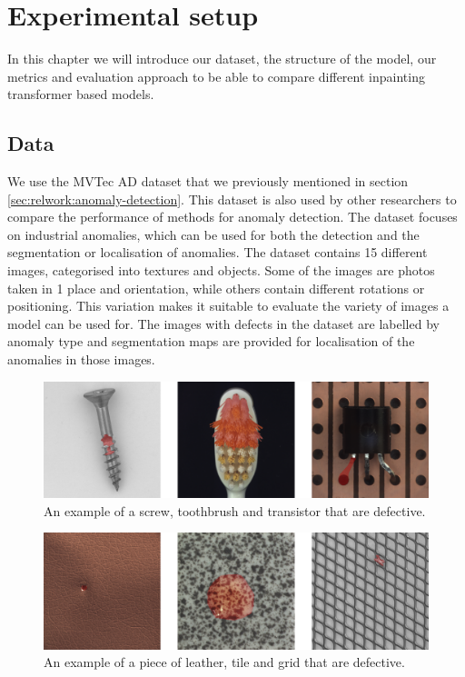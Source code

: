 \chapter{Experimental setup}\label{ch:experimental-setup}

In this chapter we will introduce our dataset, the structure of the model, our metrics and evaluation approach to be able to compare different inpainting transformer based models.

\section{Data}
\label{sec:experimental-setup:data}

We use the MVTec AD dataset that we previously mentioned in section \ref{sec:relwork:anomaly-detection}. This dataset is also used by other researchers \cite{pirnay_inpainting_2021, bergmann_improving_2019, zavrtanik_reconstruction_2021} to compare the performance of methods for anomaly detection. The dataset focuses on industrial anomalies, which can be used for both the detection and the segmentation or localisation of anomalies. The dataset contains 15 different images, categorised into textures and objects. Some of the images are photos taken in 1 place and orientation, while others contain different rotations or positioning. This variation makes it suitable to evaluate the variety of images a model can be used for. The images with defects in the dataset are labelled by anomaly type and  segmentation maps are provided for localisation of the anomalies in those images.

\begin{figure}[h!]
\centering
\includegraphics[width=\textwidth]{imgs/mvtec-example-objects.jpg}
\caption{An example of a screw, toothbrush and transistor that are defective.}
\label{fig:experimental-setup:objects-example}
\end{figure}

\begin{figure}[h!]
\centering
\includegraphics[width=\textwidth]{imgs/mvtec-example-textures.jpg}
\caption{An example of a piece of leather, tile and grid that are defective.}
\label{fig:experimental-setup:textures-example}
\end{figure}

